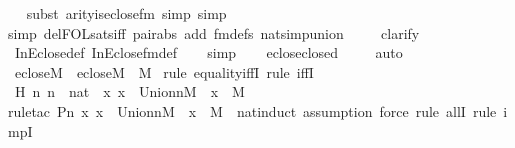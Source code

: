 \begin{isabellebody}
\ \ \isamarkupfalse%
{\isacharparenleft}{\kern0pt}subst\ arity{\isacharunderscore}{\kern0pt}is{\isacharunderscore}{\kern0pt}eclose{\isacharunderscore}{\kern0pt}fm{\isacharcomma}{\kern0pt}\ simp{\isacharcomma}{\kern0pt}\ simp{\isacharparenright}{\kern0pt}\isanewline
\ \ \ \isamarkupfalse%
{\isacharparenleft}{\kern0pt}simp\ del{\isacharcolon}{\kern0pt}FOL{\isacharunderscore}{\kern0pt}sats{\isacharunderscore}{\kern0pt}iff\ pair{\isacharunderscore}{\kern0pt}abs\ add{\isacharcolon}{\kern0pt}\ fm{\isacharunderscore}{\kern0pt}defs\ nat{\isacharunderscore}{\kern0pt}simp{\isacharunderscore}{\kern0pt}union{\isacharparenright}{\kern0pt}\ \isanewline
\ \ \isamarkupfalse%
\ clarify\isanewline
\ \ \isamarkupfalse%
\ InEclose{\isacharunderscore}{\kern0pt}def\ InEclose{\isacharunderscore}{\kern0pt}fm{\isacharunderscore}{\kern0pt}def\isanewline
\ \ \isamarkupfalse%
\ simp\isanewline
\ \ \isamarkupfalse%
\ eclose{\isacharunderscore}{\kern0pt}closed\ \isanewline
\ \ \isamarkupfalse%
\ auto%
\endisatagproof
{\isafoldproof}%
%
\isadelimproof
\isanewline
%
\endisadelimproof
\isanewline
{}\isamarkupfalse%
\ eclose{\isacharunderscore}{\kern0pt}M\ {\isacharcolon}{\kern0pt}\ {\isachardoublequoteopen}eclose{\isacharparenleft}{\kern0pt}M{\isacharparenright}{\kern0pt}\ {\isacharequal}{\kern0pt}\ M{\isachardoublequoteclose}\ \isanewline
%
\isadelimproof
%
\endisadelimproof
%
\isatagproof
{}\isamarkupfalse%
{\isacharparenleft}{\kern0pt}rule\ equality{\isacharunderscore}{\kern0pt}iffI{\isacharcomma}{\kern0pt}\ rule\ iffI{\isacharparenright}{\kern0pt}\isanewline
\ \ \isamarkupfalse%
\ H{\isacharcolon}{\kern0pt}\ {\isachardoublequoteopen}{\isasymAnd}n{\isachardot}{\kern0pt}\ n\ {\isasymin}\ nat\ {\isasymLongrightarrow}\ {\isasymforall}x{\isachardot}{\kern0pt}\ x\ {\isasymin}\ Union{\isacharcircum}{\kern0pt}n{\isacharparenleft}{\kern0pt}M{\isacharparenright}{\kern0pt}\ {\isasymlongrightarrow}\ x\ {\isasymin}\ M{\isachardoublequoteclose}\isanewline
\ \ \isamarkupfalse%
{\isacharparenleft}{\kern0pt}rule{\isacharunderscore}{\kern0pt}tac\ P{\isacharequal}{\kern0pt}{\isachardoublequoteopen}{\isasymlambda}n{\isachardot}{\kern0pt}\ {\isasymforall}x{\isachardot}{\kern0pt}\ x\ {\isasymin}\ Union{\isacharcircum}{\kern0pt}n{\isacharparenleft}{\kern0pt}M{\isacharparenright}{\kern0pt}\ {\isasymlongrightarrow}\ x\ {\isasymin}\ M{\isachardoublequoteclose}\ \ nat{\isacharunderscore}{\kern0pt}induct{\isacharcomma}{\kern0pt}\ assumption{\isacharcomma}{\kern0pt}\ force{\isacharcomma}{\kern0pt}\ rule\ allI{\isacharcomma}{\kern0pt}\ rule\ impI{\isacharparenright}{\kern0pt}\isanewline

\end{isabellebody}
